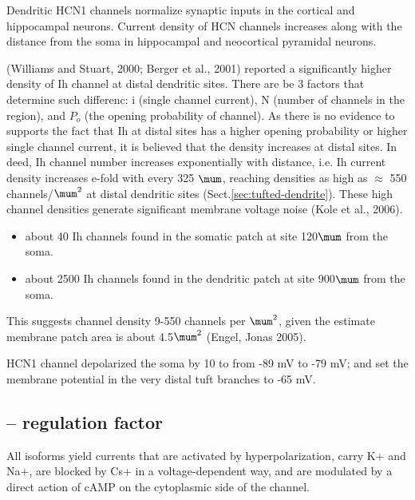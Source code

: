Dendritic HCN1 channels normalize synaptic inputs in the cortical and
hippocampal neurons.  Current density of HCN channels increases along with the
distance from the soma in hippocampal and neocortical pyramidal neurons.

(Williams and Stuart, 2000; Berger et al., 2001) reported a significantly higher
density of Ih channel at distal dendritic sites. There are be 3 factors that
determine such differenc: i (single channel current), N (number of channels in
the region), and $P_o$ (the opening probability of channel). As there is no
evidence to supports the fact that Ih at distal sites has a higher opening
probability or higher single channel current, it is believed that the density
increases at distal sites. In deed, Ih channel number increases exponentially
with distance, i.e. Ih current density increases e-fold with every 325 $\mum$,
reaching densities as high as $\approx$ 550 channels/$\mum^2$ at distal dendritic sites
(Sect.\ref{sec:tufted-dendrite}). These high channel densities generate significant
membrane voltage noise (Kole et al., 2006).
\begin{itemize}
  \item about 40 Ih channels found in the somatic patch at site 120$\mum$
  from the soma.
  \item about 2500 Ih channels found in the dendritic patch at site 900$\mum$
  from the soma.
\end{itemize}
This suggests channel density 9-550 channels per $\mum^2$, given the estimate
membrane patch area is about 4.5$\mum^2$ (Engel, Jonas 2005).

HCN1 channel depolarized the soma by 10 to from -89 mV to -79 mV; and set the membrane
potential in the very distal tuft branches to  -65 mV.


\subsection{-- regulation factor}

All isoforms yield currents that are activated by hyperpolarization, carry K+
and Na+, are blocked by Cs+ in a voltage-dependent way, and are modulated by a
direct action of cAMP on the cytoplasmic side of the channel.


